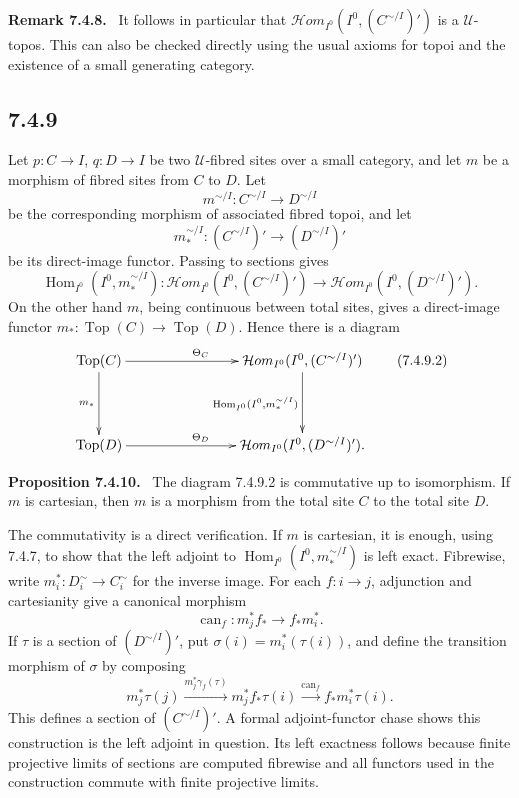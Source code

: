 \documentclass[11pt]{article}
\newcommand{\U}{\mathcal{U}}
\newcommand{\Top}{\operatorname{Top}}
\newcommand{\Hom}{\operatorname{Hom}}
\newcommand{\can}{\operatorname{can}}
\newenvironment{statement}[1]{\par\medskip\noindent\textbf{#1.}\ }{\par\medskip}
\newenvironment{remarktext}[1]{\par\medskip\noindent\textbf{#1.}\ }{\par\medskip}
\begin{document}
\begin{remarktext}{Remark 7.4.8}
It follows in particular that \(\mathcal{H}om_{I^0}(I^0,(C^{\sim/I})')\) is a \(\U\)-topos. This can also be checked directly using the usual axioms for topoi and the existence of a small generating category.
\end{remarktext}

\subsection*{7.4.9}
Let \(p:C\to I\), \(q:D\to I\) be two \(\U\)-fibred sites over a small category, and let \(m\) be a morphism of fibred sites from \(C\) to \(D\). Let
\[
 m^{\sim/I}:C^{\sim/I}\to D^{\sim/I}
\]
be the corresponding morphism of associated fibred topoi, and let
\[
 m_*^{\sim/I}:(C^{\sim/I})'\to(D^{\sim/I})'
\]
be its direct-image functor. Passing to sections gives
\[
 \Hom_{I^0}(I^0,m_*^{\sim/I}):\mathcal{H}om_{I^0}(I^0,(C^{\sim/I})')\to\mathcal{H}om_{I^0}(I^0,(D^{\sim/I})'). \tag{7.4.9.1}
\]
On the other hand \(m\), being continuous between total sites, gives a direct-image functor \(m_*:\Top(C)\to\Top(D)\). Hence there is a diagram
\[
\xymatrix@C=2.75cm@R=1.5cm{
\Top(C)\ar[r]^{\Theta_C}\ar[d]_{m_*}&\mathcal{H}om_{I^0}(I^0,(C^{\sim/I})')\ar[d]_{\Hom_{I^0}(I^0,m_*^{\sim/I})}\\
\Top(D)\ar[r]^{\Theta_D}&\mathcal{H}om_{I^0}(I^0,(D^{\sim/I})').
}\tag{7.4.9.2}
\]

\begin{statement}{Proposition 7.4.10}
The diagram 7.4.9.2 is commutative up to isomorphism. If \(m\) is cartesian, then \(m\) is a morphism from the total site \(C\) to the total site \(D\).
\end{statement}

The commutativity is a direct verification. If \(m\) is cartesian, it is enough, using 7.4.7, to show that the left adjoint to \(\Hom_{I^0}(I^0,m_*^{\sim/I})\) is left exact. Fibrewise, write \(m_i^*:D_i^{\sim}\to C_i^{\sim}\) for the inverse image. For each \(f:i\to j\), adjunction and cartesianity give a canonical morphism
\[
 \can_f:m_j^*f_*\to f_*m_i^*. \tag{7.4.10.4}
\]
If \(\tau\) is a section of \((D^{\sim/I})'\), put \(\sigma(i)=m_i^*(\tau(i))\), and define the transition morphism of \(\sigma\) by composing
\[
 m_j^*\tau(j)\xrightarrow{m_j^*\gamma_f(\tau)}m_j^*f_*\tau(i)\xrightarrow{\can_f}f_*m_i^*\tau(i). \tag{7.4.10.6}
\]
This defines a section of \((C^{\sim/I})'\). A formal adjoint-functor chase shows this construction is the left adjoint in question. Its left exactness follows because finite projective limits of sections are computed fibrewise and all functors used in the construction commute with finite projective limits.
\end{document}
